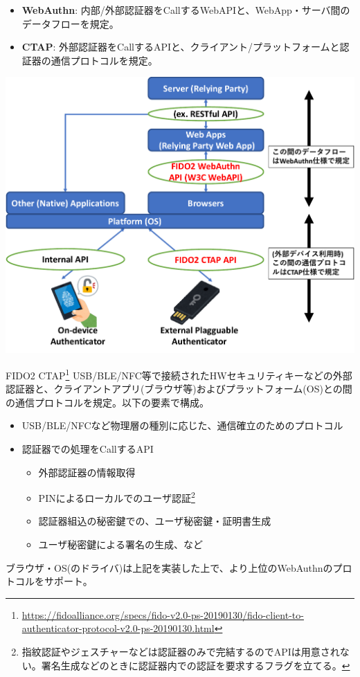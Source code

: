 \documentclass[12pt,dvipdfmx,uplatex]{beamer}
\begin{document}
\begin{frame}
\small 
\begin{itemize}
 \item \textbf{WebAuthn}: 内部/外部認証器をCallするWebAPIと、WebApp・サーバ間のデータフローを規定。
 \item \textbf{CTAP}: 外部認証器をCallするAPIと、クライアント/プラットフォームと認証器の通信プロトコルを規定。
\end{itemize}
\begin{center}
\includegraphics[width=0.7\linewidth]{Figs/FIDO2-spec-structure.pdf}
\end{center}
\end{frame}

\begin{frame}
\begin{block}{\small FIDO2 CTAP\footnote[frame]{\tiny \url{https://fidoalliance.org/specs/fido-v2.0-ps-20190130/fido-client-to-authenticator-protocol-v2.0-ps-20190130.html}}}
USB/BLE/NFC等で接続されたHWセキュリティキーなどの\alert{外部認証器と、クライアントアプリ(ブラウザ等)およびプラットフォーム(OS)との間の通信プロトコル}を規定。以下の要素で構成。
\begin{itemize}
\item USB/BLE/NFCなど物理層の種別に応じた、通信確立のためのプロトコル
\item 認証器での処理をCallするAPI
\begin{itemize}
\item 外部認証器の情報取得
\item PINによるローカルでのユーザ認証\footnote[frame]{\tiny 指紋認証やジェスチャーなどは認証器のみで完結するのでAPIは用意されない。署名生成などのときに認証器内での認証を要求するフラグを立てる。}
\item 認証器組込の秘密鍵での、ユーザ秘密鍵・証明書生成
\item ユーザ秘密鍵による署名の生成、など
\end{itemize}
\end{itemize}
\end{block}
ブラウザ・OS(のドライバ)は上記を実装した上で、より上位のWebAuthnのプロトコルをサポート。
\end{frame}
\end{document}
